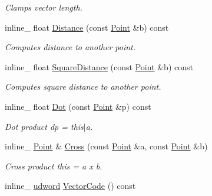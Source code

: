 \begin{DoxyCompactItemize}
\begin{DoxyCompactList}\small\item\em Clamps vector length. \end{DoxyCompactList}\item 
inline\+\_\+ float \hyperlink{classOpcode_1_1Point_a01854f3c9927beee661fb66f12280e6a}{Distance} (const \hyperlink{classOpcode_1_1Point}{Point} \&b) const \hypertarget{classOpcode_1_1Point_a01854f3c9927beee661fb66f12280e6a}{}\label{classOpcode_1_1Point_a01854f3c9927beee661fb66f12280e6a}

\begin{DoxyCompactList}\small\item\em Computes distance to another point. \end{DoxyCompactList}\item 
inline\+\_\+ float \hyperlink{classOpcode_1_1Point_abc754d335ee495d825ed39d4d537b4c1}{Square\+Distance} (const \hyperlink{classOpcode_1_1Point}{Point} \&b) const \hypertarget{classOpcode_1_1Point_abc754d335ee495d825ed39d4d537b4c1}{}\label{classOpcode_1_1Point_abc754d335ee495d825ed39d4d537b4c1}

\begin{DoxyCompactList}\small\item\em Computes square distance to another point. \end{DoxyCompactList}\item 
inline\+\_\+ float \hyperlink{classOpcode_1_1Point_a78a3a6d2203f41c04d81366ebdf07e79}{Dot} (const \hyperlink{classOpcode_1_1Point}{Point} \&p) const \hypertarget{classOpcode_1_1Point_a78a3a6d2203f41c04d81366ebdf07e79}{}\label{classOpcode_1_1Point_a78a3a6d2203f41c04d81366ebdf07e79}

\begin{DoxyCompactList}\small\item\em Dot product dp = this$\vert$a. \end{DoxyCompactList}\item 
inline\+\_\+ \hyperlink{classOpcode_1_1Point}{Point} \& \hyperlink{classOpcode_1_1Point_a2783c9dcb3c56fb25ca2b1a651477eb5}{Cross} (const \hyperlink{classOpcode_1_1Point}{Point} \&a, const \hyperlink{classOpcode_1_1Point}{Point} \&b)\hypertarget{classOpcode_1_1Point_a2783c9dcb3c56fb25ca2b1a651477eb5}{}\label{classOpcode_1_1Point_a2783c9dcb3c56fb25ca2b1a651477eb5}

\begin{DoxyCompactList}\small\item\em Cross product this = a x b. \end{DoxyCompactList}\item 
inline\+\_\+ \hyperlink{IceTypes_8h_a44c6f1920ba5551225fb534f9d1a1733}{udword} \hyperlink{classOpcode_1_1Point_acc898a697511f9ac6fe6c0ce33540bf3}{Vector\+Code} () const \hypertarget{classOpcode_1_1Point_acc898a697511f9ac6fe6c0ce33540bf3}{}\label{classOpcode_1_1Point_acc898a697511f9ac6fe6c0ce33540bf3}


\end{DoxyCompactItemize}
